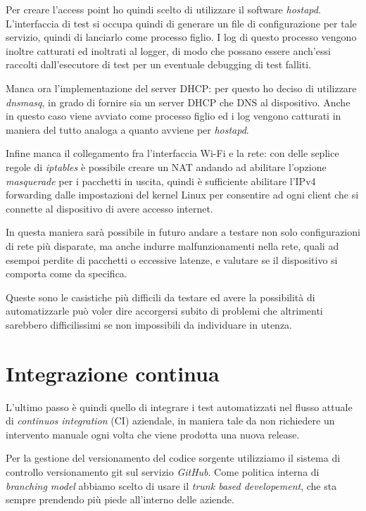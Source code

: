 \documentclass[12pt,a4paper,twoside,titlepage]{book}
\begin{document}
Per creare l'access point ho quindi scelto di utilizzare il software \textit{hostapd}.
L'interfaccia di test si occupa quindi di generare un file di configurazione per tale
servizio, quindi di lanciarlo come processo figlio. I log di questo processo vengono
inoltre catturati ed inoltrati al logger, di modo che possano essere anch'essi raccolti
dall'esecutore di test per un eventuale debugging di test falliti.

Manca ora l'implementazione del server DHCP: per questo ho deciso di utilizzare
\textit{dnsmasq}, in grado di fornire sia un server DHCP che DNS al dispositivo.
Anche in questo caso viene avviato come processo figlio ed i log vengono catturati
in maniera del tutto analoga a quanto avviene per \textit{hostapd}.

Infine manca il collegamento fra l'interfaccia Wi-Fi e la rete: con delle seplice
regole di \textit{iptables} è possibile creare un NAT andando ad abilitare l'opzione
\textit{masquerade} per i pacchetti in uscita, quindi è sufficiente abilitare l'IPv4
forwarding dalle impostazioni del kernel Linux per consentire ad ogni client che si
connette al dispositivo di avere accesso internet.

In questa maniera sarà possibile in futuro andare a testare non solo configurazioni
di rete più disparate, ma anche indurre malfunzionamenti nella rete, quali  ad esempoi
perdite di pacchetti o eccessive latenze, e valutare se il dispositivo si comporta come
da specifica.

Queste sono le casistiche più difficili da testare ed avere la possibilità di automatizzarle
può voler dire accorgersi subito di problemi che altrimenti sarebbero difficilissimi
se non impossibili da individuare in utenza.

\section{Integrazione continua}

L'ultimo passo è quindi quello di integrare i test automatizzati nel flusso attuale 
di \textit{continuos integration} (CI) aziendale, in maniera tale da non richiedere 
un intervento manuale ogni volta che viene prodotta una nuova release. 

Per la gestione del versionamento del codice sorgente utilizziamo il sistema di controllo 
versionamento \Gls{git} sul servizio \textit{GitHub}. Come politica interna di 
\textit{branching model} abbiamo scelto di usare il \textit{trunk based developement}, 
che sta sempre prendendo più piede all'interno delle aziende. 
\end{document}
